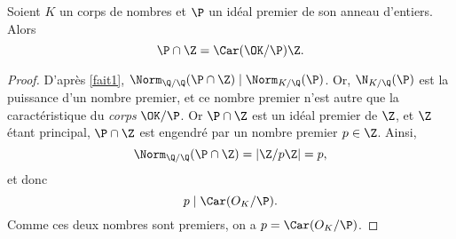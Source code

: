 \documentclass[a4paper, 12pt, oneside]{article}
\begin{document}
\begin{fait} Soient $K$ un corps de nombres et $\P$ un idéal premier de son anneau d'entiers. Alors $$\P\cap \Z = \Car(\OK/\P)\Z.$$
\end{fait}

\begin{proof}
	D'après \ref{fait1}, $\Norm_{\Q/\Q}(\P\cap\Z)\mid \Norm_{K/\Q}(\P)$. Or, $\N_{K/\Q}(\P)$ est la puissance d'un nombre premier, et ce nombre premier n'est autre que la caractéristique du \textit{corps} $\OK/\P$. Or $\P\cap \Z$ est un idéal premier de $\Z$, et $\Z$ étant principal, $\P\cap \Z$ est engendré par un nombre premier $p\in \Z$. Ainsi, $$\Norm_{\Q/\Q}(\P\cap \Z) = |\Z/p\Z| = p,$$ et donc $$p\mid \Car(O_K/\P).$$ Comme ces deux nombres sont premiers, on a $p = \Car(O_K/\P)$.
\end{proof}


\newpage
\nocite{*}
\printbibliography
\end{document}
